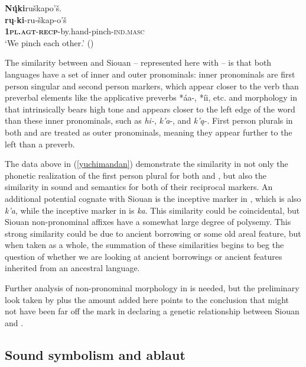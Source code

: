 \documentclass[output=paper]{LSP/langsci}
\begin{document}
	\ex  
	\glll \textbf{N\k{\'u}ki}ru\v{s}kapo'\v{s}. \\ 
	\textbf{r\k{u}}-\textbf{ki}-ru-\v{s}kap-o'\v{s}\\
			\textbf{\textsc{1pl.agt}}-\textbf{\textsc{recp}}-by.hand-pinch-\textsc{ind.masc}\\ 
	\glt `We pinch each other.' (\citealt[440]{Hollow1970})
\z
\z

The similarity between  and Siouan -- represented here with  -- is that both languages have a set of inner and outer pronominals: inner pronominals are first person singular and second person markers, which appear closer to the verb than preverbal elements like the  applicative preverbs *\'aa-, *\'ii, etc. and morphology in  that intrinsically bears high tone and appears closer to the left edge of the word than these inner pronominals, such as \emph{hi-}, \emph{k'a}-, and \emph{k'\k{a}}-. First person plurals in both  and  are treated as outer pronominals, meaning they appear further to the left than a preverb.

The data above in (\ref{yuchimandan}) demonstrate the similarity in not only the phonetic realization of the first person plural for both  and , but also the similarity in sound and semantics for both of their reciprocal markers. An additional potential cognate with Siouan is the inceptive marker in , which is also \emph{k'a}, while the inceptive marker in  is \emph{ka}. This similarity could be coincidental, but Siouan non-pronominal affixes have a somewhat large degree of polysemy.  This strong similarity could be due to ancient borrowing or some old areal feature, but when taken as a whole, the summation of these similarities begins to beg the question of whether we are looking at ancient borrowings or ancient features inherited from an ancestral language. 

Further analysis of non-pronominal morphology in  is needed, but the preliminary look taken by \citet{Rankin1998scy} plus the amount added here points to the conclusion that \citet{Sapir1929} might not have been far off the mark in declaring a genetic relationship between Siouan and .

\subsection{Sound symbolism and ablaut}
\end{document}
